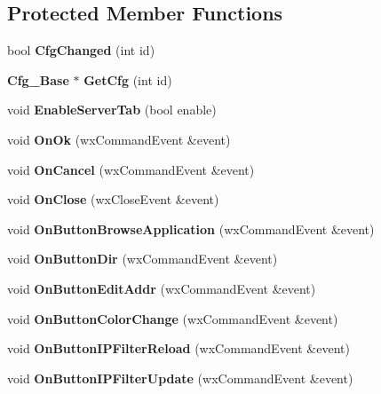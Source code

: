 \subsection*{Protected Member Functions}
\begin{DoxyCompactItemize}
\item 
bool {\bf CfgChanged} (int id)\label{classPrefsUnifiedDlg_af92e07ccb9dafb23503ade451cda8578}

\item 
{\bf Cfg\_\-Base} $\ast$ {\bf GetCfg} (int id)\label{classPrefsUnifiedDlg_a5885c6362991bc8bd06bb0c5592c0530}

\item 
void {\bfseries EnableServerTab} (bool enable)\label{classPrefsUnifiedDlg_af9245bbe0249b12e3d2ec8b17ac7b89b}

\item 
void {\bfseries OnOk} (wxCommandEvent \&event)\label{classPrefsUnifiedDlg_a1f1f2a93e6c9c1e5356ca82a58762fae}

\item 
void {\bfseries OnCancel} (wxCommandEvent \&event)\label{classPrefsUnifiedDlg_a5b42a987127f817607e6eabf9617d8eb}

\item 
void {\bfseries OnClose} (wxCloseEvent \&event)\label{classPrefsUnifiedDlg_a6d8a97ca75e169f0e662300e6d72cf2a}

\item 
void {\bfseries OnButtonBrowseApplication} (wxCommandEvent \&event)\label{classPrefsUnifiedDlg_a1cab88b97001abc94c8ab88728c8a04b}

\item 
void {\bfseries OnButtonDir} (wxCommandEvent \&event)\label{classPrefsUnifiedDlg_aaed137f609974542e1b50b966463e687}

\item 
void {\bfseries OnButtonEditAddr} (wxCommandEvent \&event)\label{classPrefsUnifiedDlg_acad51f79ab512c1462510e9e1bd08cbc}

\item 
void {\bfseries OnButtonColorChange} (wxCommandEvent \&event)\label{classPrefsUnifiedDlg_a8534f6c90d28c8505921f22f198cabee}

\item 
void {\bfseries OnButtonIPFilterReload} (wxCommandEvent \&event)\label{classPrefsUnifiedDlg_a804626c29d9d1d48516f8990c0c23eec}

\item 
void {\bfseries OnButtonIPFilterUpdate} (wxCommandEvent \&event)\label{classPrefsUnifiedDlg_a5ab6168ce3be0b661b9bad00ff4bba8d}


\end{DoxyCompactItemize}
